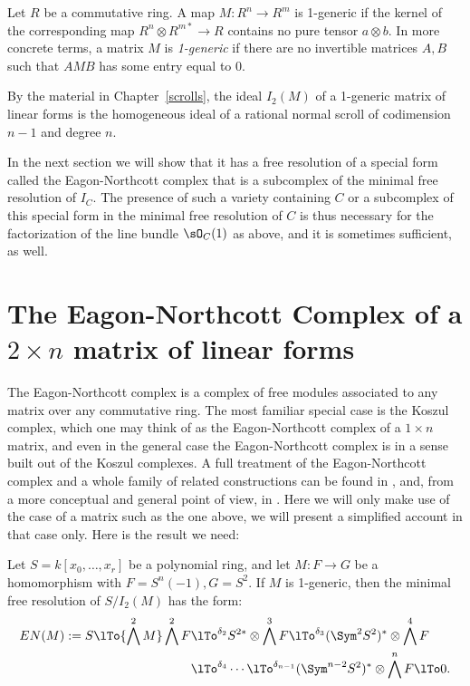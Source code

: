 \begin{definition}
Let $R$ be a commutative ring. A map $M:R^n\to R^m$ is 1-generic if the kernel of the corresponding
 map $R^{n}\otimes R^{m*} \to R$  contains no pure tensor $a\otimes b$. In more concrete terms, a matrix
$M$ is \emph{1-generic} if there are no invertible matrices $A,B$ such that  $AMB$ has some entry equal to 0.
\end{definition}

By the material in Chapter~\ref{scrolls}, the ideal $I_2(M)$ of a 1-generic matrix of linear forms is the homogeneous ideal of a rational normal 
scroll
of codimension $n-1$ and degree $n$. 

In the next section we will show that it has a free resolution of a special form called the 
Eagon-Northcott complex that is a subcomplex of the minimal free resolution of $I_C$. The presence of such a variety containing $C$ or
a subcomplex of this special form in the minimal free resolution of $C$ is thus necessary for the 
factorization of the line bundle $\sO_C(1)$ as above, and it is sometimes sufficient, as well.

\section{The Eagon-Northcott Complex of a $2\times n$ matrix of linear forms}

The Eagon-Northcott complex is a complex of free modules associated to any matrix over any commutative ring. The most familiar special case is the Koszul complex, which one may think of as the Eagon-Northcott complex of a $1\times n$ matrix, and  even in the general case the Eagon-Northcott complex is in a sense built out of the Koszul complexes. A full treatment of the Eagon-Northcott complex and a whole family of related constructions can be found in 
\cite[Appendix ***]{Eisenbud1995}, and, from a more conceptual and general point of view, in \cite{Weyman-book}. Here we will only
make use of the case of a matrix such as the one above, we will present a simplified account in that case only. Here is the result we need:

\begin{theorem}\label{Eagon-Northcott}
 Let $S = k[x_0,\dots, x_r]$ be a polynomial ring,  and let $M: F\to G$ be a homomorphism with
 $F = S^n(-1), G= S^2$. If $M$ is 1-generic, then the minimal free resolution of $S/I_2(M)$ has the form:
\begin{align*}
EN(M) := 
S \lTo{\bigwedge^2 M} 
 \bigwedge^2 F&
 \lTo^{\delta_{2}}
 S^{2*}\otimes \bigwedge^3 F  \lTo^{\delta_{3}}
  (\Sym^2S^{2})^*\otimes\bigwedge^4F  \\
 &\lTo^{\delta_{4}}\cdots\lTo^{\delta_{n-1}} 
(\Sym^{n-2}S^{2})^*\otimes\bigwedge^nF 
 \lTo 0.
\end{align*}
\end{theorem}

